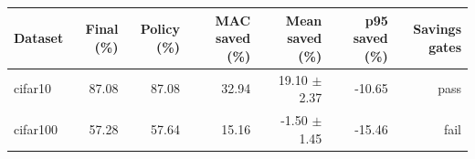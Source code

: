 \begin{tabular}{lrrrrrr}
\hline
Dataset & Final (\%) & Policy (\%) & MAC saved (\%) & Mean saved (\%) & p95 saved (\%) & Savings gates \\
\hline
cifar10 & 87.08 & 87.08 & 32.94 & 19.10 $\pm$ 2.37 & -10.65 & pass \\
cifar100 & 57.28 & 57.64 & 15.16 & -1.50 $\pm$ 1.45 & -15.46 & fail \\
\hline
\end{tabular}
